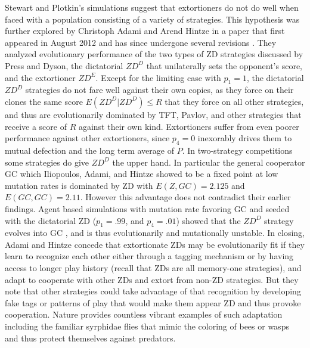 Stewart and Plotkin's simulations suggest that extortioners do not do well when faced with a population consisting of a variety of strategies. This hypothesis was further explored by Christoph Adami and Arend Hintze in a paper that first appeared in August 2012 and has since undergone several revisions \cite{Adami_Hintze_2014}. They analyzed evolutionary performance of the two types of ZD strategies discussed by Press and Dyson, the dictatorial  $ZD^D$ that unilaterally sets the opponent's score, and the extortioner $ZD^E$. Except for the limiting case with $p_1 = 1$, the dictatorial $ZD^D$ strategies do not fare well against their own copies, as they force on their clones the same score $E(ZD^D | ZD^D) \leq R$ that they force on all other strategies, and thus are evolutionarily dominated by TFT, Pavlov, and other strategies that receive a score of $R$ against their own kind. Extortioners suffer from even poorer performance against other extortioners, since $p_4 = 0$ inexorably drives them to mutual defection and the long term average of $P$. In two-strategy competitions some strategies do give $ZD^D$ the upper hand. In particular the general cooperator GC which Iliopoulos, Adami, and Hintze showed to be a fixed point at low mutation rates \cite{iliopoulos_2010} is dominated by ZD with $E(Z, GC) = 2.125$ and $E(GC, GC) = 2.11$. However this advantage does not contradict their earlier findings. Agent based simulations with mutation rate favoring GC and seeded with the dictatorial ZD ($p_1 = .99$, and $p_4 = .01$) showed that the $ZD^D$ strategy evolves into GC \cite{Adami_Hintze_2014}, and is thus evolutionarily and mutationally unstable. In closing, Adami and Hintze concede that extortionate ZDs may be evolutionarily fit if they learn to recognize each other either through a tagging mechanism or by having access to longer play history (recall that ZDs are all memory-one strategies), and adapt to cooperate with other ZDs and extort from non-ZD strategies. But they note that other strategies could take advantage of that recognition by developing fake tags or patterns of play that would make them appear ZD and thus provoke cooperation. Nature provides countless vibrant examples of such adaptation including the familiar syrphidae flies that mimic the coloring of bees or wasps and thus protect themselves against predators.

